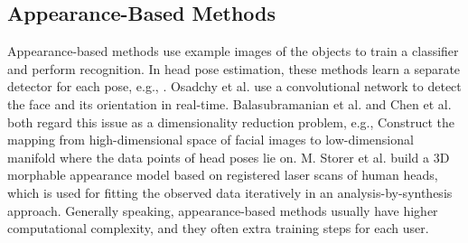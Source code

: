 \subsection{Appearance-Based Methods}
Appearance-based methods use example images of the objects to train a classifier and perform recognition. In head pose estimation, these methods learn a separate detector for each pose, e.g., \cite{Ref2,Ref7}. Osadchy et al. \cite{Ref5} use a convolutional network to detect the face and its orientation in real-time. Balasubramanian et al. \cite{Ref4} and Chen et al. \cite{Ref17} both regard this issue as a dimensionality reduction problem, e.g., Construct the mapping from high-dimensional space of facial images to low-dimensional manifold where the data points of head poses lie on. M. Storer et al.\cite{Ref6} build a 3D morphable appearance model based on registered laser scans of human heads, which is used for fitting the observed data iteratively in an analysis-by-synthesis approach. Generally speaking, appearance-based methods usually have higher computational complexity, and they often extra training steps for each user.

